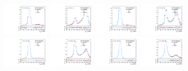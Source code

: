 \begin{figure}[htbp]
  \centering
  \includegraphics[width=0.21\textwidth]{fig/uncertainties/systs_res_e_HP_bb_LDy_resTopY_ProjY.pdf}
  \includegraphics[width=0.21\textwidth]{fig/uncertainties/systs_res_e_LP_bb_LDy_resTopY_ProjY.pdf}
  \includegraphics[width=0.21\textwidth]{fig/uncertainties/systs_res_e_HP_bb_HDy_resTopY_ProjY.pdf}
  \includegraphics[width=0.21\textwidth]{fig/uncertainties/systs_res_e_LP_bb_HDy_resTopY_ProjY.pdf}\\
  \includegraphics[width=0.21\textwidth]{fig/uncertainties/systs_res_e_HP_nobb_LDy_resTopY_ProjY.pdf}
  \includegraphics[width=0.21\textwidth]{fig/uncertainties/systs_res_e_LP_nobb_LDy_resTopY_ProjY.pdf}
  \includegraphics[width=0.21\textwidth]{fig/uncertainties/systs_res_e_HP_nobb_HDy_resTopY_ProjY.pdf}
  \includegraphics[width=0.21\textwidth]{fig/uncertainties/systs_res_e_LP_nobb_HDy_resTopY_ProjY.pdf}\\

\end{figure}
